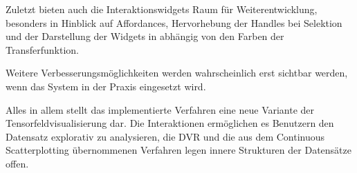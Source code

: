 \documentclass[a4paper,fontsize=12pt,toc=bib,halfparskip]{scrartcl}
\begin{document}
Zuletzt bieten auch die Interaktionswidgets Raum f\"ur Weiterentwicklung, besonders in Hinblick auf Affordances, Hervorhebung der Handles bei Selektion und der Darstellung der Widgets in abh\"angig von den Farben der Transferfunktion.
 
Weitere Verbesserungsm\"oglichkeiten werden wahrscheinlich erst sichtbar werden, wenn das System in der Praxis eingesetzt wird. 

Alles in allem stellt das implementierte Verfahren eine neue Variante der Tensorfeldvisualisierung dar. Die Interaktionen erm\"oglichen es Benutzern den Datensatz explorativ zu analysieren, die DVR und die aus dem Continuous Scatterplotting \"ubernommenen Verfahren legen innere Strukturen der Datens\"atze offen.


\label{LastPageBeforeRefs}
\clearpage
{}

\printbibliography
\label{LastBibPage}
\end{document}
